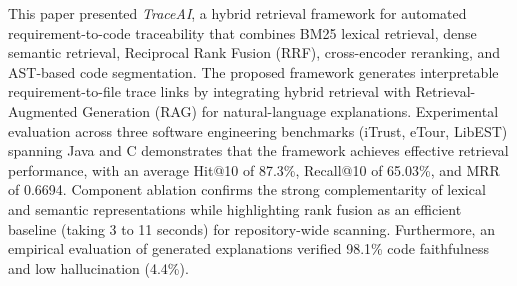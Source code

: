 \documentclass[conference]{IEEEtran}
\begin{document}
This paper presented \textit{TraceAI}, a hybrid retrieval framework for automated requirement-to-code traceability that combines BM25 lexical retrieval, dense semantic retrieval, Reciprocal Rank Fusion (RRF), cross-encoder reranking, and AST-based code segmentation. The proposed framework generates interpretable requirement-to-file trace links by integrating hybrid retrieval with Retrieval-Augmented Generation (RAG) for natural-language explanations. Experimental evaluation across three software engineering benchmarks (iTrust, eTour, LibEST) spanning Java and C demonstrates that the framework achieves effective retrieval performance, with an average Hit@10 of 87.3\%, Recall@10 of 65.03\%, and MRR of 0.6694. Component ablation confirms the strong complementarity of lexical and semantic representations while highlighting rank fusion as an efficient baseline (taking 3 to 11 seconds) for repository-wide scanning. Furthermore, an empirical evaluation of generated explanations verified 98.1\% code faithfulness and low hallucination (4.4\%).
\end{document}
